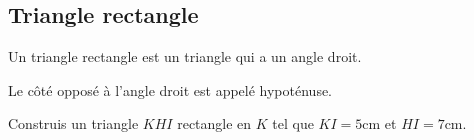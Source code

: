 \documentclass[a4paper,10pt]{report}
\begin{document}
\subsection{Triangle rectangle}

\begin{defn}
\vspace{0.12cm}
Un triangle rectangle est un triangle qui a un angle droit.
\vspace{0.12cm}
\end{defn}

\begin{rem}
Le côté opposé à l'angle droit est appelé hypoténuse.
\end{rem}

\begin{ex}
Construis un triangle $KHI$ rectangle en $K$ tel que $KI=5$cm et $HI=7$cm.


\end{ex}
\end{document}

